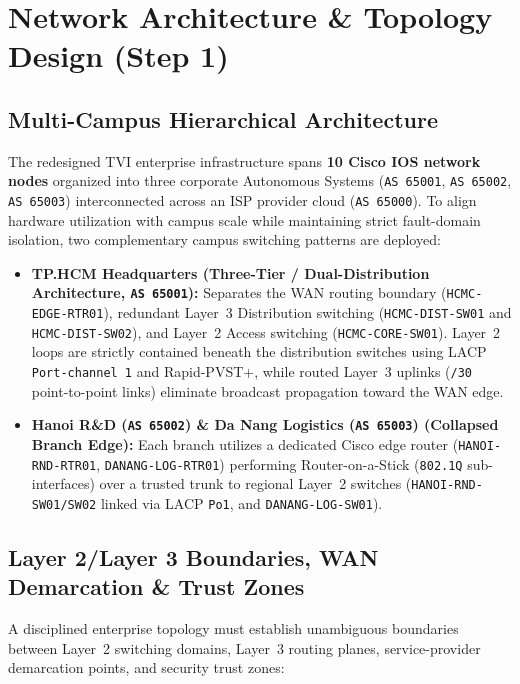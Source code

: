\section{Network Architecture \& Topology Design (Step 1)}

\subsection{Multi-Campus Hierarchical Architecture}
The redesigned TVI enterprise infrastructure spans \textbf{10 Cisco IOS network nodes} organized into three corporate Autonomous Systems (\texttt{AS 65001}, \texttt{AS 65002}, \texttt{AS 65003}) interconnected across an ISP provider cloud (\texttt{AS 65000}). To align hardware utilization with campus scale while maintaining strict fault-domain isolation, two complementary campus switching patterns are deployed:

\begin{itemize}[leftmargin=1.5em, itemsep=3pt]
    \item \textbf{TP.HCM Headquarters (Three-Tier / Dual-Distribution Architecture, \texttt{AS 65001}):} Separates the WAN routing boundary (\texttt{HCMC-EDGE-RTR01}), redundant Layer~3 Distribution switching (\texttt{HCMC-DIST-SW01} and \texttt{HCMC-DIST-SW02}), and Layer~2 Access switching (\texttt{HCMC-CORE-SW01}). Layer~2 loops are strictly contained beneath the distribution switches using LACP \texttt{Port-channel 1} and Rapid-PVST+, while routed Layer~3 uplinks (\texttt{/30} point-to-point links) eliminate broadcast propagation toward the WAN edge.
    \item \textbf{Hanoi R\&D (\texttt{AS 65002}) \& Da Nang Logistics (\texttt{AS 65003}) (Collapsed Branch Edge):} Each branch utilizes a dedicated Cisco edge router (\texttt{HANOI-RND-RTR01}, \texttt{DANANG-LOG-RTR01}) performing Router-on-a-Stick (\texttt{802.1Q} sub-interfaces) over a trusted trunk to regional Layer~2 switches (\texttt{HANOI-RND-SW01/SW02} linked via LACP \texttt{Po1}, and \texttt{DANANG-LOG-SW01}).
\end{itemize}

\subsection{Layer 2/Layer 3 Boundaries, WAN Demarcation \& Trust Zones}
A disciplined enterprise topology must establish unambiguous boundaries between Layer~2 switching domains, Layer~3 routing planes, service-provider demarcation points, and security trust zones:

